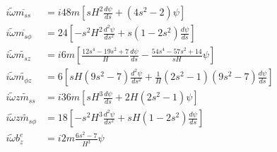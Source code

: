 \begin{equation}\label{eqn:eigen-pgmag-poloidal-dipole}
\begin{aligned}
    i \widetilde{\omega} \overline{m_{ss}} &= i48m \left[ sH^2 \frac{d\psi}{d s} + \left(4 s^{2} - 2\right) \psi\right] \\ 
    i \widetilde{\omega} \overline{m_{s\phi}} &= 24 \left[-s^2 H^{2} \frac{d^{2} \psi}{d s^{2}} + s\left(1-2s^2\right) \frac{d\psi}{d s}\right] \\
    i \widetilde{\omega} \widetilde{m_{sz}} &= i6m \left[\frac{12s^4 - 19s^2 + 7}{H} \frac{d\psi}{d s} - \frac{54s^4 - 57s^2 + 14}{sH} \psi\right] \\
    i \widetilde{\omega} \widetilde{m_{\phi z}} &= 6 \left[sH \left(9 s^{2} - 7\right) \frac{d^{2}\psi}{d s^{2}} + \frac{1}{H}\left(2s^2 - 1\right)\left(9s^2 - 7\right) \frac{d\psi}{d s}\right] \\
    i \widetilde{\omega} \widetilde{zm_{ss}} &= i36 m \left[s H^{3} \frac{d\psi}{d s} + 2H \left(2 s^{2} - 1 \right) \psi\right] \\
    i \widetilde{\omega} \widetilde{zm_{s\phi}} &= 18 \left[- s^2 H^{3} \frac{d^{2}\psi}{d s^{2}} + sH \left(1 - 2s^2\right) \frac{d \psi}{d s} \right] \\
    i \widetilde{\omega} b_{z}^e &= i2m \frac{6s^2 - 7}{H^3} \psi \\

\end{aligned}
\end{equation}
